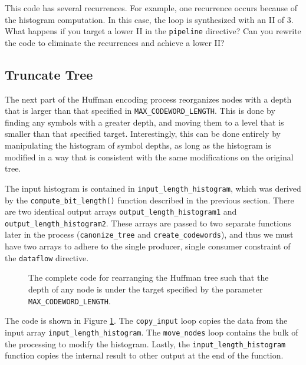 \begin{exercise}
This code has several recurrences.  For example, one recurrence occurs because of the histogram computation.  In this case, the loop is synthesized with an II of 3.  What happens if you target a lower II in the \lstinline{pipeline} directive?  Can you rewrite the code to eliminate the recurrences and achieve a lower II?
\end{exercise}

\subsection{Truncate Tree}
\label{sec:huffman_truncate_tree}

The next part of the Huffman encoding process reorganizes nodes with a depth that is larger than that specified in \lstinline{MAX_CODEWORD_LENGTH}. This is done by finding any symbols with a greater depth, and moving them to a level that is smaller than that specified target.   Interestingly, this can be done entirely by manipulating the histogram of symbol depths, as long as the histogram is modified in a way that is consistent with the same modifications on the original tree.


The input histogram is contained in \lstinline{input_length_histogram}, which was derived by the \lstinline{compute_bit_length()} function described in the previous section. There are two identical output arrays \lstinline{output_length_histogram1} and \lstinline{output_length_histogram2}. These arrays are passed to two separate functions later in the process (\lstinline{canonize_tree} and \lstinline{create_codewords}), and thus we must have two arrays to adhere to the single producer, single consumer constraint of the \lstinline{dataflow} directive.

\begin{figure}

\end{figure}
\begin{figure}

\caption{The complete code for rearranging the Huffman tree such that the depth of any node is under the target specified by the parameter \lstinline{MAX_CODEWORD_LENGTH}. }
\label{fig:huffman_truncate_tree.cpp}
\end{figure}

The code is shown in Figure \ref{fig:huffman_truncate_tree.cpp}. The \lstinline{copy_input} loop copies the data from the input array \lstinline{input_length_histogram}. The \lstinline{move_nodes} loop contains the bulk of the processing to modify the histogram.  Lastly, the \lstinline{input_length_histogram} function copies the internal result to other output at the end of the function. 

